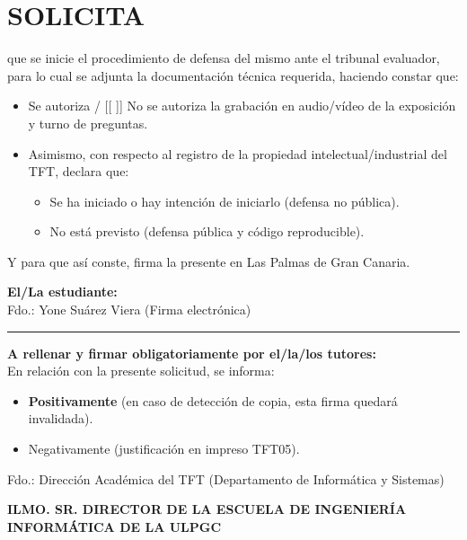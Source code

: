 \documentclass[11pt,a4paper,twoside]{report}
\begin{document}
\section*{SOLICITA}
que se inicie el procedimiento de defensa del mismo ante el tribunal evaluador, para lo cual se adjunta la documentación técnica requerida, haciendo constar que:
\begin{itemize}
    \item[{[X]}] Se autoriza / [{[ ]}] No se autoriza la grabación en audio/vídeo de la exposición y turno de preguntas.
    \item Asimismo, con respecto al registro de la propiedad intelectual/industrial del TFT, declara que:
    \begin{itemize}
        \item[{[ ]}] Se ha iniciado o hay intención de iniciarlo (defensa no pública).
        \item[{[X]}] No está previsto (defensa pública y código reproducible).
    \end{itemize}
\end{itemize}

Y para que así conste, firma la presente en Las Palmas de Gran Canaria.

\vspace{1.5cm}
\noindent\textbf{El/La estudiante:} \\
Fdo.: Yone Suárez Viera (Firma electrónica)

\vspace{1.5cm}
\hrule
\vspace{0.5cm}
\noindent\textbf{A rellenar y firmar obligatoriamente por el/la/los tutores:} \\[0.2cm]
En relación con la presente solicitud, se informa:
\begin{itemize}
    \item[{[X]}] \textbf{Positivamente} (en caso de detección de copia, esta firma quedará invalidada).
    \item[{[ ]}] Negativamente (justificación en impreso TFT05).
\end{itemize}
\vspace{1cm}
Fdo.: Dirección Académica del TFT (Departamento de Informática y Sistemas)

\vspace{1.5cm}
\noindent\textbf{ILMO. SR. DIRECTOR DE LA ESCUELA DE INGENIERÍA INFORMÁTICA DE LA ULPGC}

\newpage
{}

\end{document}

